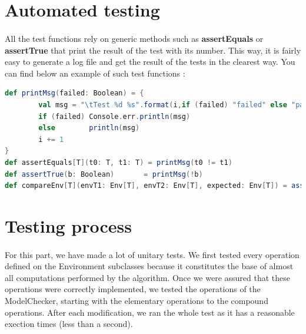\documentclass{report}
\begin{document}
\section{Automated testing}

\paragraph{}
\hspace{4mm}All the test functions rely on generic methods such as \textbf{assertEquals} or \textbf{assertTrue} that print
the result of the test with its number. This way, it is fairly easy to generate a log file and get the result of the tests
in the clearest way. You can find below an example of such test functions :

\begin{lstlisting}[language=scala]
def printMsg(failed: Boolean) = { 
        val msg = "\tTest %d %s".format(i,if (failed) "failed" else "passed") 
        if (failed) Console.err.println(msg)
        else        println(msg)
        i += 1
}
def assertEquals[T](t0: T, t1: T) = printMsg(t0 != t1)
def assertTrue(b: Boolean)       = printMsg(!b)
def compareEnv[T](envT1: Env[T], envT2: Env[T], expected: Env[T]) = assertEquals(envT1 interEnv envT2,    def testNeg[T](env: Env[T], envs: Env[T]*)  = assertEquals(!env,Set(envs: _*))
\end{lstlisting}
\section{Testing process}

\paragraph{}
\hspace{4mm}For this part, we have made a lot of unitary tests. We first tested every operation defined on the Environment subclasses
because it constitutes the base of almost all computations performed by the algorithm. Once we were assured that these operations were correctly implemented,
we tested the operations of the ModelChecker, starting with the elementary operations to the compound operations. 
After each modification, we ran the whole test as it has a reasonable exection times (less than a second).
\end{document}

